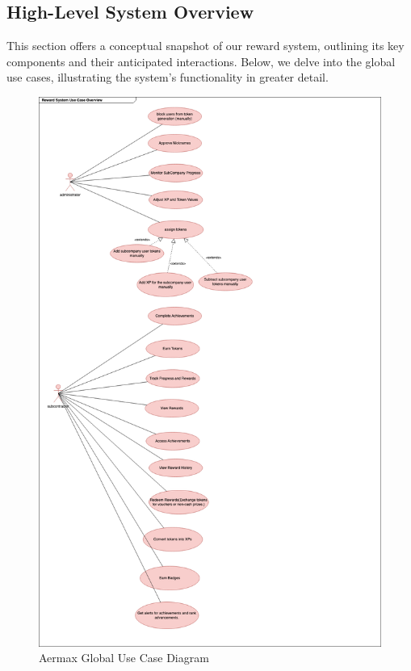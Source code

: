 \subsection{High-Level System Overview}
This section offers a conceptual snapshot of our reward system, outlining its key components and their anticipated interactions. Below, we delve into the global use cases, illustrating the system's functionality in greater detail.
 \begin{figure}[H]
    \centering
    \includegraphics[width=1\textwidth]{src/assets/chapters/raward-sysetm-usecase.drawio.png}
    \caption{Aermax Global Use Case Diagram}
    \label{fig:globa_usecase_diagram}
\end{figure}

